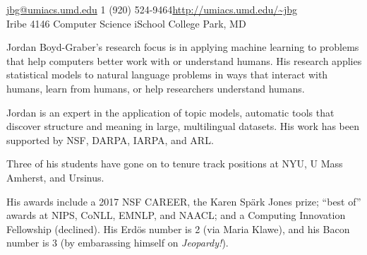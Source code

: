 \documentclass[10pt,a4paper]{article} %
\begin{document}


\noindent\href{mailto:jbg@umiacs.umd.edu}{jbg@umiacs.umd.edu}\bull %
\textsmaller{+}1 (920) 524-9464\bull \href{http://umiacs.umd.edu/~jbg}{\url{http://umiacs.umd.edu/~jbg}}\\ %
Iribe 4146 \bull Computer Science \bull iSchool \bull College Park, MD

\spacedhrule{0.9em}{-0.4em} %



\vspace{-1.3em} %

\begin{multicols}{2}  %

Jordan Boyd-Graber's research focus is in applying machine learning
to problems that help computers better
work with or understand humans.  His research
applies statistical models to natural language problems in ways that
interact with humans, learn from humans, or help researchers
understand humans.

Jordan is an expert in the application of topic models, automatic
tools that discover structure and meaning in large, multilingual
datasets. His work has been supported by NSF, DARPA, IARPA, and ARL.

Three of his students have gone on to tenure track positions at NYU, U
Mass Amherst, and Ursinus.

His awards include a 2017 NSF CAREER, the Karen Sp\"ark Jones prize;
``best of'' awards at NIPS, CoNLL, EMNLP, and NAACL; and a Computing
Innovation Fellowship (declined).  His Erd\"os number is 2 (via Maria Klawe), and his
Bacon number is 3 (by embarassing himself on \textit{Jeopardy!}).

\end{multicols}
\end{document}
